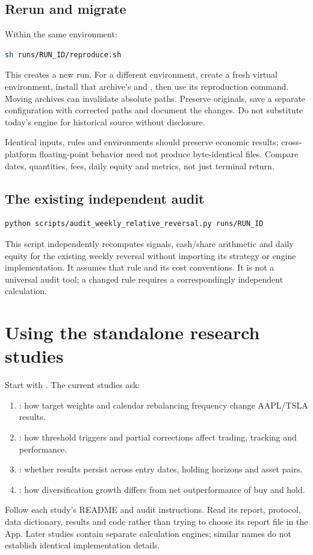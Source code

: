 \documentclass[11pt]{article}
\let\originalsection\section
\renewcommand{\section}{\Needspace{9\baselineskip}\originalsection}
\let\originalsubsection\subsection
\renewcommand{\subsection}{\Needspace{8\baselineskip}\originalsubsection}
\begin{document}
\subsection{Rerun and migrate}
Within the same environment:
\begin{lstlisting}[language=bash]
sh runs/RUN_ID/reproduce.sh
\end{lstlisting}
This creates a new run. For a different environment, create a fresh virtual environment, install that archive's  and , then use its reproduction command. Moving archives can invalidate absolute paths. Preserve originals, save a separate configuration with corrected paths and document the changes. Do not substitute today's engine for historical source without disclosure.

Identical inputs, rules and environments should preserve economic results; cross-platform floating-point behavior need not produce byte-identical files. Compare dates, quantities, fees, daily equity and metrics, not just terminal return.

\subsection{The existing independent audit}
\begin{lstlisting}[language=bash]
python scripts/audit_weekly_relative_reversal.py runs/RUN_ID
\end{lstlisting}
This script independently recomputes signals, cash/share arithmetic and daily equity for the existing weekly reversal without importing its strategy or engine implementation. It assumes that rule and its cost conventions. It is not a universal audit tool; a changed rule requires a correspondingly independent calculation.

\section{Using the standalone research studies}
Start with . The current studies ask:
\begin{enumerate}
\item {}: how target weights and calendar rebalancing frequency change AAPL/TSLA results.
\item {}: how threshold triggers and partial corrections affect trading, tracking and performance.
\item {}: whether results persist across entry dates, holding horizons and asset pairs.
\item {}: how diversification growth differs from net outperformance of buy and hold.
\end{enumerate}
Follow each study's README and audit instructions. Read its report, protocol, data dictionary, results and code rather than trying to choose its report file in the App. Later studies contain separate calculation engines; similar names do not establish identical implementation details.
\end{document}
